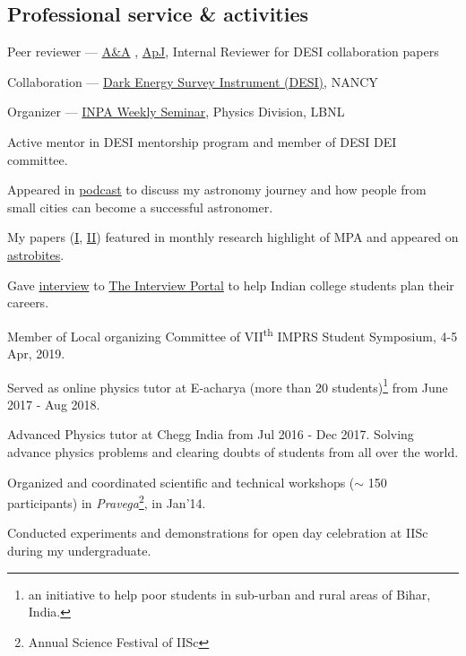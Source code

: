 \documentclass[12pt,letterpaper]{article}
\begin{document}

\subsection{Professional service \& activities}
\begin{list}{}{\cvlist}
    \item Peer reviewer ---
    \href{https://en.wikipedia.org/wiki/Astronomy_%26_Astrophysics}{A\&A}
    , \href{https://en.wikipedia.org/wiki/The_Astrophysical_Journal}{ApJ}, Internal Reviewer for DESI collaboration papers
    \item Collaboration ---
        \href{https://www.desi.lbl.gov/}{Dark Energy Survey Instrument (DESI)}, NANCY
    \item Organizer ---
        \href{https://inpa.lbl.gov/events/}{INPA Weekly Seminar}, Physics Division, LBNL
    \item Active mentor in DESI mentorship program and member of DESI DEI committee.
    \item Appeared in \href{https://www.youtube.com/watch?v=WmA_PnYLeCg}{podcast} to discuss my astronomy journey and how people from small cities can become a successful astronomer.
    \item My papers (\href{https://www.mpa-garching.mpg.de/964620/hl202107}{I}, \href{https://www.mpa-garching.mpg.de/1066558/hl202211?c=27981}{II}) featured in monthly research highlight of MPA and appeared on \href{https://astrobites.org/2021/05/06/cool-metal-gas-search-thanks-it-was-automated/}{astrobites}.
    \item Gave \href{https://theinterviewportal.com/2020/03/13/astrophysicist-interview-8/}{interview} to \href{https://theinterviewportal.com/}{The Interview Portal} to help Indian college students plan their careers.
    \item Member of Local organizing Committee of VII\textsuperscript{th} IMPRS Student Symposium, 4-5 Apr, 2019.
  \item Served as online physics tutor at E-acharya (more than 20 students)\footnote{an initiative to help poor students in sub-urban and rural areas of Bihar, India.} from June 2017 - Aug 2018.
    \item Advanced Physics tutor at Chegg India from Jul 2016 - Dec 2017. Solving advance physics problems and clearing doubts of students from all over the world.
  \item Organized and coordinated scientific and technical workshops ($\sim$ 150 participants) in \emph{Pravega}\footnote{Annual Science Festival of IISc}, in Jan'14.
    \item Conducted experiments and demonstrations for open day celebration at IISc during my undergraduate.
\end{list}
\end{document}
